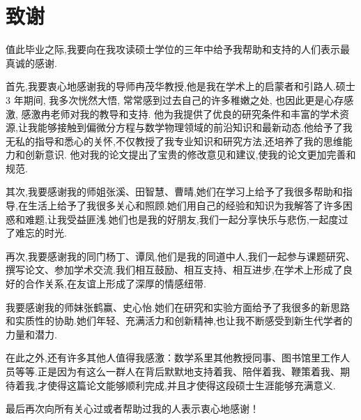 \chapter{致谢}
值此毕业之际,我要向在我攻读硕士学位的三年中给予我帮助和支持的人们表示最真诚的感谢.

首先,我要衷心地感谢我的导师冉茂华教授,他是我在学术上的启蒙者和引路人.硕士 3 年期间, 我多次恍然大悟, 常常感到过去自己的许多稚嫩之处, 也因此更是心存感激, 感激冉老师对我的教导和支持.
他为我提供了优良的研究条件和丰富的学术资源,让我能够接触到偏微分方程与数学物理领域的前沿知识和最新动态.他给予了我无私的指导和悉心的关怀,不仅教授了我专业知识和研究方法,还培养了我的思维能力和创新意识.
他对我的论文提出了宝贵的修改意见和建议,使我的论文更加完善和规范.

其次,我要感谢我的师姐张溪、田智慧、曹晴,她们在学习上给予了我很多帮助和指导,在生活上给予了我很多关心和照顾.她们用自己的经验和知识为我解答了许多困惑和难题,让我受益匪浅.她们也是我的好朋友,我们一起分享快乐与悲伤,一起度过了难忘的时光.

再次,我要感谢我的同门杨丁、谭凤,他们是我的同道中人,我们一起参与课题研究、撰写论文、参加学术交流.我们相互鼓励、相互支持、相互进步,在学术上形成了良好的合作关系,在友谊上形成了深厚的情感纽带.

我要感谢我的师妹张鹤赢、史心怡.她们在研究和实验方面给予了我很多的新思路和实质性的协助.她们年轻、充满活力和创新精神,也让我不断感受到新生代学者的力量和潜力.

在此之外,还有许多其他人值得我感激：数学系里其他教授同事、图书馆里工作人员等等.正是因为有这么一群人在背后默默地支持着我、陪伴着我、鞭策着我、期待着我,才使得这篇论文能够顺利完成,并且才使得这段硕士生涯能够充满意义.

最后再次向所有关心过或者帮助过我的人表示衷心地感谢！